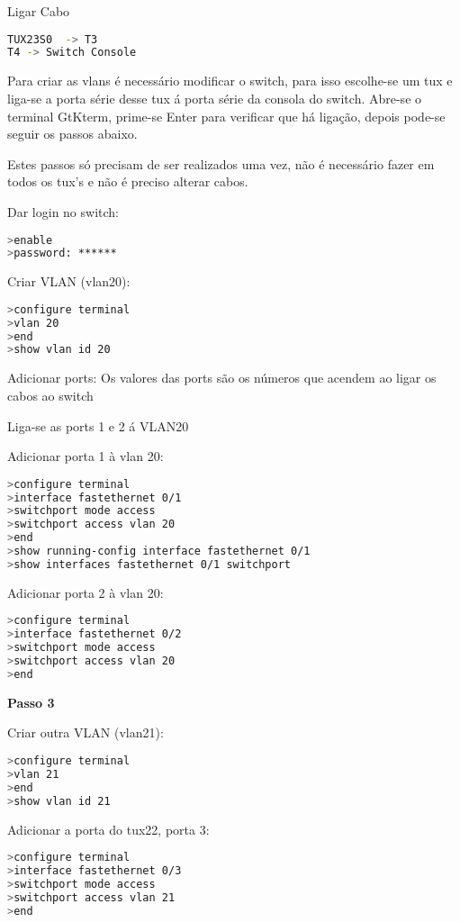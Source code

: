 Ligar Cabo 

\begin{lstlisting}[language=bash]
TUX23S0  -> T3
T4 -> Switch Console
\end{lstlisting}

Para criar as vlans é necessário modificar o switch, para isso escolhe-se um tux e liga-se a porta série desse tux á porta série da consola do switch. Abre-se o terminal GtKterm, prime-se Enter para verificar que há ligação, depois pode-se seguir os passos abaixo.

Estes passos só precisam de ser realizados uma vez, não é necessário fazer em todos os tux's e não é preciso alterar cabos.

Dar login no switch:
\begin{lstlisting}[language=bash]
>enable
>password: ****** 
\end{lstlisting}

Criar VLAN (vlan20):
\begin{lstlisting}[language=bash]
>configure terminal
>vlan 20
>end
>show vlan id 20
\end{lstlisting}

Adicionar ports: Os valores das ports são os números que acendem ao ligar os cabos ao switch

Liga-se as ports 1 e 2 á VLAN20

Adicionar porta 1 à vlan 20:
\begin{lstlisting}[language=bash]
>configure terminal
>interface fastethernet 0/1 
>switchport mode access
>switchport access vlan 20
>end
>show running-config interface fastethernet 0/1
>show interfaces fastethernet 0/1 switchport
\end{lstlisting}
Adicionar porta 2 à vlan 20:
\begin{lstlisting}[language=bash]
>configure terminal
>interface fastethernet 0/2            
>switchport mode access
>switchport access vlan 20
>end
\end{lstlisting}


\textbf{Passo 3}

Criar outra VLAN (vlan21):
\begin{lstlisting}[language=bash]
>configure terminal
>vlan 21
>end
>show vlan id 21
\end{lstlisting}
Adicionar a porta do tux22, porta 3:
\begin{lstlisting}[language=bash]
>configure terminal
>interface fastethernet 0/3            
>switchport mode access
>switchport access vlan 21
>end
\end{lstlisting}

